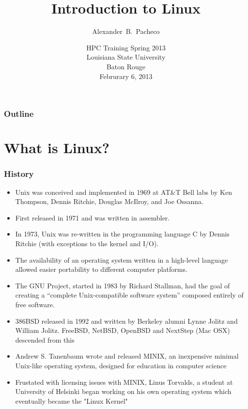 \documentclass[slidestop,mathserif,compress,xcolor=svgnames]{beamer}
\title{Introduction to Linux}
\author[Alex Pacheco]{\large{Alexander~B.~Pacheco}}
\institute[HPC Training: Spring 2013] {\inst{}\footnotesize{User Services Consultant\\LSU HPC \& LONI\\sys-help@loni.org}}
\date[\hfill{February 6, 2013\hspace{2cm}\insertframenumber/\inserttotalframenumber}]{\scriptsize{HPC Training Spring 2013\\Louisiana State University\\Baton Rouge\\Februrary 6, 2013}}
\begin{document}
\frame{\titlepage}

\footnotesize

\begin{frame}[label=toc,squeeze]
  \footnotesize
  \frametitle{\small{Outline}}
  \tableofcontents
\end{frame}

\section{What is Linux?}
\begin{frame}[allowframebreaks]
  \frametitle{\small History}
  \begin{itemize}
    \item Unix was conceived and implemented in 1969 at AT\&T Bell labs by  Ken Thompson, Dennis Ritchie, Douglas McIlroy, and Joe Ossanna.
    \item First released in 1971 and was written in assembler.
    \item In 1973, Unix was re-written in the programming language C by Dennis Ritchie (with exceptions to the kernel and I/O).
    \item The availability of an operating system written in a high-level language allowed easier portability to different computer platforms.
    \item The GNU Project, started in 1983 by Richard Stallman, had the goal of creating a ``complete Unix-compatible software system'' composed entirely of free software.
    \item 386BSD released in 1992 and written by Berkeley alumni Lynne Jolitz and William Jolitz. FreeBSD, NetBSD, OpenBSD and NextStep (Mac OSX) descended from this
    \item Andrew S. Tanenbaum wrote and released MINIX, an inexpensive minimal Unix-like operating system, designed for education in computer science
%
    \item Frustated with licensing issues with MINIX, Linus Torvalds, a student at University of Helsinki began working on his own operating system which eventually became the "Linux Kernel"

\end{itemize}
\end{frame}
\end{document}
